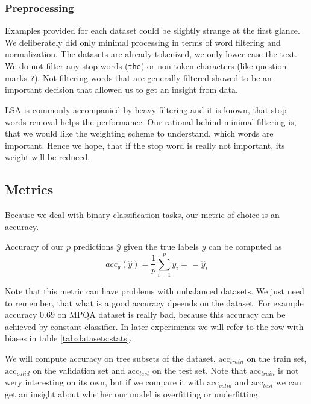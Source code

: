     \subsubsection{Preprocessing} \label{sec:preprocessing}
    
    Examples provided for each dataset could be slightly strange at the first glance.
    We deliberately did only minimal processing in terms of word filtering and normalization.
    The datasets are already tokenized, we only lower-case the text.
    We do not filter any stop words (\texttt{the}) or non token characters (like question marks \texttt{?}). 
    Not filtering words that are generally filtered showed to be an important decision that allowed us to get an insight from data.
    
    LSA is commonly accompanied by heavy filtering and it is known, that stop words removal helps the performance.
    Our rational behind minimal filtering is, that we would like the weighting scheme to understand, which words are important.
    Hence we hope, that if the stop word is really not important, its weight will be reduced.
    
    \subsection{Metrics}
    
    Because we deal with binary classification tasks, our metric of choice is an accuracy.
    
    Accuracy of our $p$ predictions $\hat{y}$ given the true labels $y$ can be computed as
    $$acc_y(\hat{y}) = \frac{1}{p}\sum_{i=1}^py_i ==\hat{y}_i$$
    
    Note that this metric can have problems with unbalanced datasets. 
    We just need to remember, that what is a good accuracy dpeends on the dataset.
    For example accuracy $0.69$ on MPQA dataset is really bad, because this accuracy can be achieved by constant classifier.
    In later experiments we will refer to the row with biases in table \ref{tab:datasets:stats}.
    
    We will compute accuracy on tree subsets of the dataset. 
    $\mathrm{acc}_{train}$ on the train set, $\mathrm{acc}_{valid}$ on the validation set and $\mathrm{acc}_{test}$ on the test set.
    Note that $\mathrm{acc}_{train}$ is not wery interesting on its own, but if we compare it with $\mathrm{acc}_{valid}$ and $\mathrm{acc}_{test}$ we can get an insight about whether our model is overfitting or underfitting.



